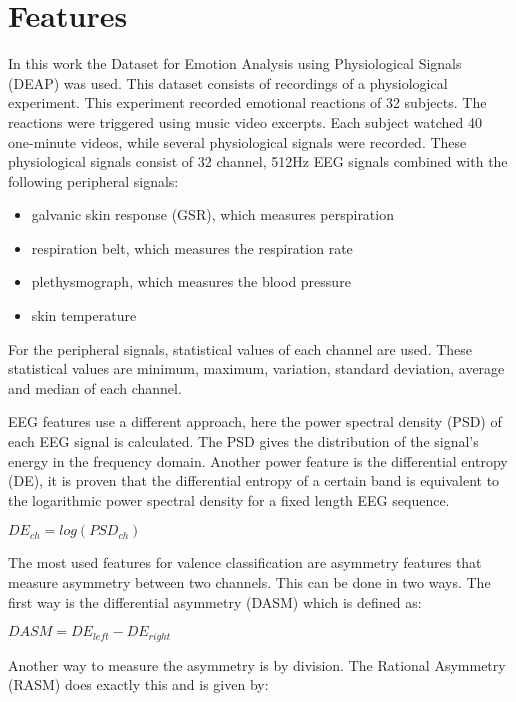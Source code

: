 \documentclass[12pt,journal,compsoc]{IEEEtran}
\newcommand{\npar}{\par \vspace{2.3ex plus 0.3ex minus 0.3ex}}
\begin{document}
\section{Features} \label{features}
\npar
In this work the Dataset for Emotion Analysis using Physiological Signals (DEAP) was used. This dataset consists of recordings of a physiological experiment. This experiment recorded emotional reactions of 32 subjects. The reactions were triggered using music video excerpts. Each subject watched 40 one-minute videos, while several physiological signals were recorded. These physiological signals consist of 32 channel, 512Hz EEG signals combined with the following peripheral signals:
\begin{itemize}
\item galvanic skin response (GSR), which measures perspiration
\item respiration belt, which measures the respiration rate
\item plethysmograph, which measures the blood pressure
\item skin temperature
\end{itemize}
For the peripheral signals, statistical values of each channel are used. These statistical values are minimum, maximum, variation, standard deviation, average and median of each channel. 

\npar

EEG features use a different approach, here the power spectral density (PSD) of each EEG signal is calculated. The PSD gives the distribution of the signal's energy in the frequency domain. Another power feature is the differential entropy (DE), it is proven that the differential entropy of a certain band is equivalent to the logarithmic power spectral density for a fixed length EEG sequence.

\begin{center}
$DE_{ch} = log(PSD_{ch})$
\end{center}

The most used features for valence classification are asymmetry features that measure asymmetry between two channels. This can be done in two ways. The first way is the differential asymmetry (DASM) which is defined as:

\begin{center}
$DASM = DE_{left} - DE_{right}$
\end{center}

Another way to measure the asymmetry is by division. The Rational Asymmetry (RASM) does exactly this and is given by:
\end{document}
